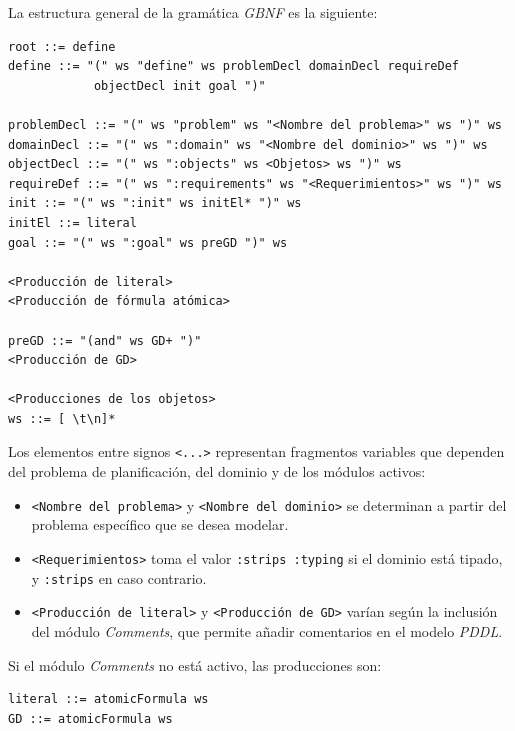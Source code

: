 La estructura general de la gramática \textit{GBNF} es la siguiente:

\begin{tcolorbox}[colback=blue!5!white, colframe=blue!75!black, title=Gramática \textit{GBNF} general, fonttitle=\bfseries, breakable]
\small
\begin{verbatim}
root ::= define
define ::= "(" ws "define" ws problemDecl domainDecl requireDef 
            objectDecl init goal ")"

problemDecl ::= "(" ws "problem" ws "<Nombre del problema>" ws ")" ws
domainDecl ::= "(" ws ":domain" ws "<Nombre del dominio>" ws ")" ws
objectDecl ::= "(" ws ":objects" ws <Objetos> ws ")" ws
requireDef ::= "(" ws ":requirements" ws "<Requerimientos>" ws ")" ws
init ::= "(" ws ":init" ws initEl* ")" ws
initEl ::= literal
goal ::= "(" ws ":goal" ws preGD ")" ws

<Producción de literal>
<Producción de fórmula atómica>

preGD ::= "(and" ws GD+ ")"
<Producción de GD>

<Producciones de los objetos>
ws ::= [ \t\n]*
\end{verbatim}
\end{tcolorbox}

Los elementos entre signos \texttt{<...>} representan fragmentos variables que dependen del problema de planificación, del dominio y de los módulos activos:

\begin{itemize}
    \item \texttt{<Nombre del problema>} y \texttt{<Nombre del dominio>} se determinan a partir del problema específico que se desea modelar.
    \item \texttt{<Requerimientos>} toma el valor \texttt{:strips :typing} si el dominio está tipado, y \texttt{:strips} en caso contrario.
    \item \texttt{<Producción de literal>} y \texttt{<Producción de GD>} varían según la inclusión del módulo \textit{Comments}, que permite añadir comentarios en el modelo \textit{PDDL}. 
\end{itemize}

Si el módulo \textit{Comments} no está activo, las producciones son:

\begin{tcolorbox}[colback=blue!5!white, colframe=blue!75!black, title=Producciones sin módulo \textit{Comments}, fonttitle=\bfseries, breakable]
\small
\begin{verbatim}
literal ::= atomicFormula ws
GD ::= atomicFormula ws
\end{verbatim}
\end{tcolorbox}

